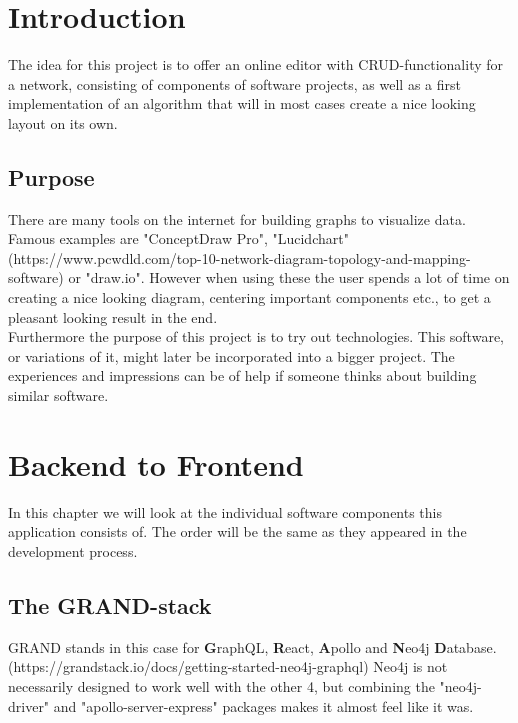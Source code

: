 \chapter{Introduction}
The idea for this project is to offer an online editor with CRUD-functionality for a network, consisting of components of software projects, as well as a first implementation of an algorithm that will in most cases create a nice looking layout on its own.

\section{Purpose}
There are many tools on the internet for building graphs to visualize data. Famous examples are "ConceptDraw Pro", "Lucidchart" (https://www.pcwdld.com/top-10-network-diagram-topology-and-mapping-software) or "draw.io". However when using these the user spends a lot of time on creating a nice looking diagram, centering important components etc., to get a pleasant looking result in the end. \\
Furthermore the purpose of this project is to try out technologies. This software, or variations of it, might later be incorporated into a bigger project.  The experiences and impressions can be of help if someone thinks about building similar software.


\chapter{Backend to Frontend}
In this chapter we will look at the individual software components this application consists of. The order will be the same as they appeared in the development process.

\section{The GRAND-stack}
GRAND stands in this case for \textbf{G}raphQL, \textbf{R}eact, \textbf{A}pollo and \textbf{N}eo4j \textbf{D}atabase. (https://grandstack.io/docs/getting-started-neo4j-graphql) Neo4j is not necessarily designed to work well with the other 4, but combining the "neo4j-driver" and "apollo-server-express" packages makes it almost feel like it was.

